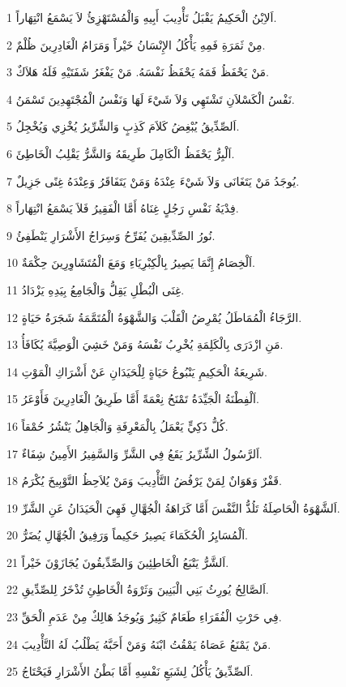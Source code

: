 \par 1 اَلاِبْنُ الْحَكِيمُ يَقْبَلُ تَأْدِيبَ أَبِيهِ وَالْمُسْتَهْزِئُ لاَ يَسْمَعُ انْتِهَاراً.
\par 2 مِنْ ثَمَرَةِ فَمِهِ يَأْكُلُ الإِنْسَانُ خَيْراً وَمَرَامُ الْغَادِرِينَ ظُلْمٌ.
\par 3 مَنْ يَحْفَظُ فَمَهُ يَحْفَظُ نَفْسَهُ. مَنْ يَفْغَرُ شَفَتَيْهِ فَلَهُ هَلاَكٌ.
\par 4 نَفْسُ الْكَسْلاَنِ تَشْتَهِي وَلاَ شَيْءَ لَهَا وَنَفْسُ الْمُجْتَهِدِينَ تَسْمَنُ.
\par 5 اَلصِّدِّيقُ يُبْغِضُ كَلاَمَ كَذِبٍ وَالشِّرِّيرُ يُخْزِي وَيُخْجِلُ.
\par 6 اَلْبِرُّ يَحْفَظُ الْكَامِلَ طَرِيقَهُ وَالشَّرُّ يَقْلِبُ الْخَاطِئَ.
\par 7 يُوجَدُ مَنْ يَتَغَانَى وَلاَ شَيْءَ عِنْدَهُ وَمَنْ يَتَفَاقَرُ وَعِنْدَهُ غِنًى جَزِيلٌ.
\par 8 فِدْيَةُ نَفْسِ رَجُلٍ غِنَاهُ أَمَّا الْفَقِيرُ فَلاَ يَسْمَعُ انْتِهَاراً.
\par 9 نُورُ الصِّدِّيقِينَ يُفَرِّحُ وَسِرَاجُ الأَشْرَارِ يَنْطَفِئُ.
\par 10 اَلْخِصَامُ إِنَّمَا يَصِيرُ بِالْكِبْرِيَاءِ وَمَعَ الْمُتَشَاوِرِينَ حِكْمَةٌ.
\par 11 غِنَى الْبُطْلِ يَقِلُّ وَالْجَامِعُ بِيَدِهِ يَزْدَادُ.
\par 12 الرَّجَاءُ الْمُمَاطَلُ يُمْرِضُ الْقَلْبَ وَالشَّهْوَةُ الْمُتَمَّمَةُ شَجَرَةُ حَيَاةٍ.
\par 13 مَنِ ازْدَرَى بِالْكَلِمَةِ يُخْرِبُ نَفْسَهُ وَمَنْ خَشِيَ الْوَصِيَّةَ يُكَافَأُ.
\par 14 شَرِيعَةُ الْحَكِيمِ يَنْبُوعُ حَيَاةٍ لِلْحَيَدَانِ عَنْ أَشْرَاكِ الْمَوْتِ.
\par 15 اَلْفِطْنَةُ الْجَيِّدَةُ تَمْنَحُ نِعْمَةً أَمَّا طَرِيقُ الْغَادِرِينَ فَأَوْعَرُ.
\par 16 كُلُّ ذَكِيٍّ يَعْمَلُ بِالْمَعْرِفَةِ وَالْجَاهِلُ يَنْشُرُ حُمْقاً.
\par 17 اَلرَّسُولُ الشِّرِّيرُ يَقَعُ فِي الشَّرِّ وَالسَّفِيرُ الأَمِينُ شِفَاءٌ.
\par 18 قَفْرٌ وَهَوَانٌ لِمَنْ يَرْفُضُ التَّأْدِيبَ وَمَنْ يُلاَحِظُ التَّوْبِيخَ يُكْرَمُ.
\par 19 اَلشَّهْوَةُ الْحَاصِلَةُ تَلُذُّ النَّفْسَ أَمَّا كَرَاهَةُ الْجُهَّالِ فَهِيَ الْحَيَدَانُ عَنِ الشَّرِّ.
\par 20 اَلْمُسَايِرُ الْحُكَمَاءَ يَصِيرُ حَكِيماً وَرَفِيقُ الْجُهَّالِ يُضَرُّ.
\par 21 اَلشَّرُّ يَتْبَعُ الْخَاطِئِينَ وَالصِّدِّيقُونَ يُجَازَوْنَ خَيْراً.
\par 22 اَلصَّالِحُ يُورِثُ بَنِي الْبَنِينَ وَثَرْوَةُ الْخَاطِئِ تُذْخَرُ لِلصِّدِّيقِ.
\par 23 فِي حَرْثِ الْفُقَرَاءِ طَعَامٌ كَثِيرٌ وَيُوجَدُ هَالِكٌ مِنْ عَدَمِ الْحَقِّ.
\par 24 مَنْ يَمْنَعُ عَصَاهُ يَمْقُتُ ابْنَهُ وَمَنْ أَحَبَّهُ يَطْلُبُ لَهُ التَّأْدِيبَ.
\par 25 اَلصِّدِّيقُ يَأْكُلُ لِشَبَعِ نَفْسِهِ أَمَّا بَطْنُ الأَشْرَارِ فَيَحْتَاجُ.

